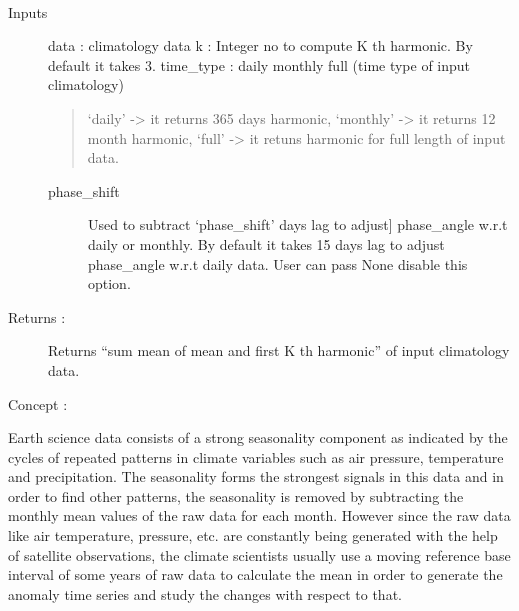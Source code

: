\documentclass[letterpaper,10pt,english]{sphinxmanual}
\begin{document}
\begin{fulllineitems}
\label{miso:harmonic_util.harmonic}~\begin{description}
\item[{Inputs}] \leavevmode{[}{]}
data : climatology data 
k : Integer no to compute K th harmonic. By default it takes 3.
time\_type : daily \textbar{} monthly \textbar{} full (time type of input climatology)
\begin{quote}

`daily' -\textgreater{} it returns 365 days harmonic,
`monthly' -\textgreater{} it returns 12 month harmonic,
`full' -\textgreater{} it retuns harmonic for full length of 
input data.
\end{quote}
\begin{description}
\item[{phase\_shift}] \leavevmode{[}Used to subtract `phase\_shift' days lag to adjust{]}
phase\_angle w.r.t daily or monthly. By default it takes
15 days lag to adjust phase\_angle w.r.t daily data.
User can pass None disable this option.

\end{description}

\item[{Returns :}] \leavevmode
Returns ``sum mean of mean and first K th harmonic'' of input 
climatology data.

\end{description}

Concept :

Earth science data consists of a strong seasonality component as 
indicated by the cycles of repeated patterns in climate variables such 
as air pressure, temperature and precipitation. The seasonality forms 
the strongest signals in this data and in order to find other patterns,
the seasonality is removed by subtracting the monthly mean values of the
raw data for each month. However since the raw data like air temperature,
pressure, etc. are constantly being generated with the help of satellite
observations, the climate scientists usually use a moving reference base 
interval of some years of raw data to calculate the mean in order to 
generate the anomaly time series and study the changes with respect to
that.


\end{fulllineitems}
\end{document}
